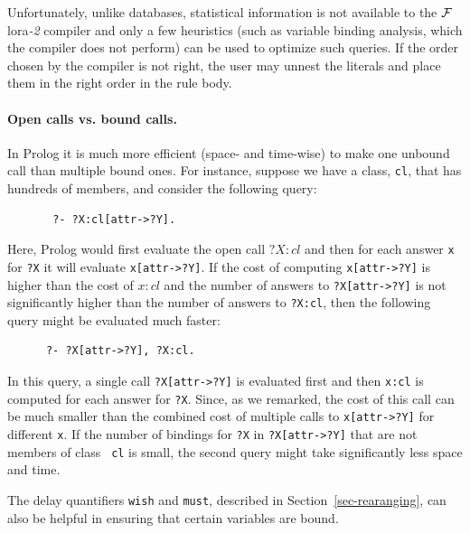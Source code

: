 \documentclass[11pt]{article}
\newcommand{\FLORA}{{\mbox{\sc ${\cal F}${lora}\rm\emph{-2}}}\xspace}
\newcommand{\FLSYSTEM}{\FLORA}
\begin{document}
Unfortunately, unlike databases, statistical information is not
available to the \FLSYSTEM compiler and only a few heuristics (such as
variable binding analysis, which the compiler does not perform) can be used
to optimize such queries. If the order chosen by the compiler is not right,
the user may unnest the literals and place them in the right
order in the rule body.

\paragraph{Open calls vs. bound calls.}
In Prolog it is much more efficient (space- and
time-wise) to make one unbound call than multiple bound ones. For instance,
suppose we have a class, {\tt cl}, that has hundreds of members, and
consider the following query:
\begin{verbatim}
       ?- ?X:cl[attr->?Y].  
\end{verbatim}
Here, Prolog would first evaluate the open call $?X:cl$ and then for each
answer {\tt x} for {\tt ?X} it will evaluate {\tt x[attr->?Y]}.
If the cost of computing {\tt x[attr->?Y]} is higher than the cost of $x:cl$
and the number of answers to {\tt ?X[attr->?Y]} is not significantly
higher than the number of answers to {\tt ?X:cl}, then the following query
might be evaluated much faster:
\begin{verbatim}
      ?- ?X[attr->?Y], ?X:cl.  
\end{verbatim}
In this query, a single call {\tt ?X[attr->?Y]} is evaluated first and then
{\tt x:cl} is computed for each answer for {\tt ?X}.  Since, as we remarked,
the cost of this call can be much smaller than the combined cost of
multiple calls to {\tt x[attr->?Y]} for different {\tt x}.  If the number of
bindings for {\tt ?X} in {\tt ?X[attr->?Y]} that are not members of class {\tt
  cl} is small, the second query might take significantly less space and
time.

The delay quantifiers \texttt{wish} and \texttt{must}, described in
Section~\ref{sec-rearanging}, can also be helpful
in ensuring that certain variables are bound.  
\end{document}
